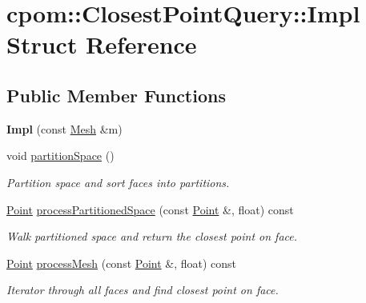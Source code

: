\hypertarget{structcpom_1_1_closest_point_query_1_1_impl}{}\section{cpom\+:\+:Closest\+Point\+Query\+:\+:Impl Struct Reference}
\label{structcpom_1_1_closest_point_query_1_1_impl}
\subsection*{Public Member Functions}
\begin{DoxyCompactItemize}
\item 
{\bfseries Impl} (const \hyperlink{classcpom_1_1_mesh}{Mesh} \&m)\hypertarget{structcpom_1_1_closest_point_query_1_1_impl_a7727f506992c4316c7f5312d9900995a}{}\label{structcpom_1_1_closest_point_query_1_1_impl_a7727f506992c4316c7f5312d9900995a}

\item 
void \hyperlink{structcpom_1_1_closest_point_query_1_1_impl_a9cf9e53cd705a095109f038eb8942a42}{partition\+Space} ()\hypertarget{structcpom_1_1_closest_point_query_1_1_impl_a9cf9e53cd705a095109f038eb8942a42}{}\label{structcpom_1_1_closest_point_query_1_1_impl_a9cf9e53cd705a095109f038eb8942a42}

\begin{DoxyCompactList}\small\item\em Partition space and sort faces into partitions. \end{DoxyCompactList}\item 
\hyperlink{structcpom_1_1_float3}{Point} \hyperlink{structcpom_1_1_closest_point_query_1_1_impl_ad4c32848ce82b2b963c0e0b12049da59}{process\+Partitioned\+Space} (const \hyperlink{structcpom_1_1_float3}{Point} \&, float) const \hypertarget{structcpom_1_1_closest_point_query_1_1_impl_ad4c32848ce82b2b963c0e0b12049da59}{}\label{structcpom_1_1_closest_point_query_1_1_impl_ad4c32848ce82b2b963c0e0b12049da59}

\begin{DoxyCompactList}\small\item\em Walk partitioned space and return the closest point on face. \end{DoxyCompactList}\item 
\hyperlink{structcpom_1_1_float3}{Point} \hyperlink{structcpom_1_1_closest_point_query_1_1_impl_a91bc5660bc4efe0013a65903888e21ff}{process\+Mesh} (const \hyperlink{structcpom_1_1_float3}{Point} \&, float) const \hypertarget{structcpom_1_1_closest_point_query_1_1_impl_a91bc5660bc4efe0013a65903888e21ff}{}\label{structcpom_1_1_closest_point_query_1_1_impl_a91bc5660bc4efe0013a65903888e21ff}

\begin{DoxyCompactList}\small\item\em Iterator through all faces and find closest point on face. \end{DoxyCompactList}\end{DoxyCompactItemize}
